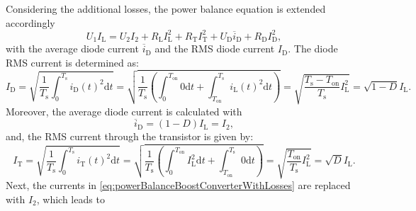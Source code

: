 
\begin{solutionblock}
	Considering the additional losses, the power balance equation is extended accordingly
	\begin{equation}
		U_1 I_{\mathrm{L}} = U_2 I_2 + R_{\mathrm{L}} I_{\mathrm{L}}^2 + R_{\mathrm{T}} I_{\mathrm{T}}^2 + U_{\mathrm{D}} \overline{i}_{\mathrm{D}} + R_{\mathrm{D}} I_{\mathrm{D}}^2,
		\label{eq:powerBalanceBoostConverterWithLosses}
	\end{equation}
	with the average diode current $\overline{i}_{\mathrm{D}}$ and the RMS diode current $I_{\mathrm{D}}$. The diode RMS current is determined as:
	\begin{equation}
		I_{\mathrm{D}} = \sqrt{\frac{1}{T_\mathrm{s}} \int_{0}^{T_\mathrm{s}} i_{\mathrm{D}}(t)^2 \mathrm{d}t}
		= \sqrt{\frac{1}{T_\mathrm{s}} \left( \int_{0}^{T_{\mathrm{on}}} 0 \mathrm{d}t + \int_{T_{\mathrm{on}}}^{T_{\mathrm{s}}} i_{\mathrm{L}}(t)^2 \mathrm{d}t \right)}
		= \sqrt{\frac{{T_{\mathrm{s}}-T_{\mathrm{on}}}}{T_{\mathrm{s}}}I_{\mathrm{L}}^2}
		= \sqrt{1-D}I_{\mathrm{L}}.
	\end{equation}
	Moreover, the average diode current is calculated with
	\begin{equation}
		\overline{i}_{\mathrm{D}} = (1-D)I_{\mathrm{L}} = I_2,
		\label{eq:avgCurrentDiode}
	\end{equation}
	and, the RMS current through the transistor is given by:
	\begin{equation}
		I_{\mathrm{T}} = \sqrt{\frac{1}{T_\mathrm{s}} \int_{0}^{T_\mathrm{s}} i_{\mathrm{T}}(t)^2 \mathrm{d}t}
		= \sqrt{\frac{1}{T_{\mathrm{s}}}\left(\int_{0}^{T_{\mathrm{on}}} I_{\mathrm{L}}^2 \mathrm{d} t + \int_{T_{\mathrm{on}}}^{T_{\mathrm{s}}} 0 \mathrm{d} t \right)}
		= \sqrt{\frac{T_{\mathrm{on}}}{T_{\mathrm{s}}}I_{\mathrm{L}}^2}
		= \sqrt{D} I_{\mathrm{L}}.
	\end{equation}
	Next, the currents in \eqref{eq:powerBalanceBoostConverterWithLosses} are replaced with $I_{\mathrm{2}}$, which leads to
	\begin{equation}

\end{equation}
\end{solutionblock}
